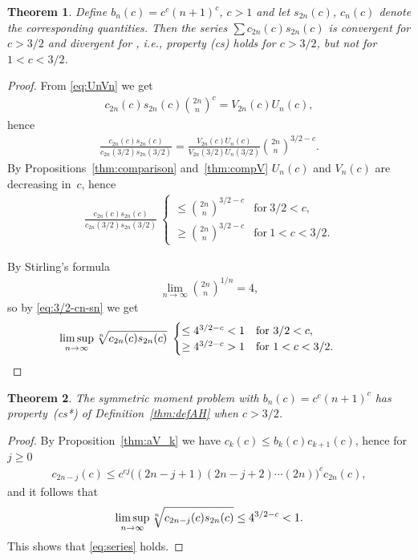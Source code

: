 \documentclass[pdftex]{sigma}
\numberwithin{equation}{section}
\newtheorem{thm}{Theorem}[section]
\begin{document}
\begin{thm}\label{thm:c>3/2}Define $b_n(c)=c^c(n+1)^c$, $c>1$ and let $s_{2n}(c)$, $c_n(c)$ denote the correspon\-ding quantities. Then the series $\sum c_{2n}(c) s_{2n}(c)$ is convergent for $c>3/2$ and divergent for , i.e., property {\rm(cs)} holds for $c>3/2$, but not for $1<c<3/2$.
\end{thm}

\begin{proof} From \eqref{eq:UnVn} we get
\begin{gather*}
c_{2n}(c)s_{2n}(c)\binom{2n}{n}^c=V_{2n}(c)U_n(c),
\end{gather*}
hence
\begin{gather*}
\frac{c_{2n}(c)s_{2n}(c)}{c_{2n}(3/2)s_{2n}(3/2)}=\frac{V_{2n}(c)U_n(c)}{V_{2n}(3/2)U_n(3/2)}\binom{2n}{n}^{3/2-c}.
\end{gather*}
By Propositions~\ref{thm:comparison} and~\ref{thm:compV} $U_n(c)$ and $V_n(c)$ are decreasing in~$c$, hence
\begin{gather*}
\frac{c_{2n}(c)s_{2n}(c)}{c_{2n}(3/2)s_{2n}(3/2)}\ \begin{cases}
\le \binom{2n}{n}^{3/2-c} & \text{for} \ 3/2 < c,\\
\ge \binom{2n}{n}^{3/2-c} & \text{for} \ 1 < c<3/2.
\end{cases}
\end{gather*}

By Stirling's formula
\begin{gather*}
\lim_{n\to\infty} \binom{2n}{n}^{1/n}=4,
\end{gather*}
so by \eqref{eq:3/2-cn-sn} we get
\begin{gather*}
\limsup_{n\to\infty}\root{n} \of{c_{2n}(c)s_{2n}(c)} \ \begin{cases} \le 4^{3/2-c} < 1& \text{for} \ 3/2 < c, \\
\ge 4^{3/2-c} >1& \text{for} \ 1 < c < 3/2.
\end{cases}\tag*{\qed}
\end{gather*}\renewcommand{\qed}{}
\end{proof}

\begin{thm}\label{thm:AH-c>3/2} The symmetric moment problem with $b_n(c)=c^c(n+1)^c$ has property~{\rm (cs*)} of Definition~{\rm \ref{thm:defAH}} when $c>3/2$.
\end{thm}

\begin{proof} By Proposition~\ref{thm:aV_k} we have $c_k(c)\le b_k(c)c_{k+1}(c)$, hence for $j\ge 0$
\begin{gather*}
c_{2n-j}(c)\le c^{cj}\big((2n-j+1)(2n-j+2)\cdots(2n)\big)^c c_{2n}(c),
\end{gather*}
and it follows that
\begin{gather*}
\limsup_{n\to\infty} \root{n} \of{c_{2n-j}(c)s_{2n}(c)}\le 4^{3/2-c}<1.
\end{gather*}
This shows that \eqref{eq:series} holds.
\end{proof}
\end{document}
